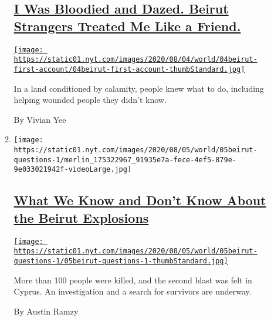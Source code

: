 \begin{enumerate}
\begin{enumerate}
    \hypertarget{i-was-bloodied-and-dazed-beirut-strangers-treated-me-like-a-friend}{%
    \subsection{\texorpdfstring{\href{/2020/08/04/world/middleeast/lebanon-explosion-beirut.html}{I
    Was Bloodied and Dazed. Beirut Strangers Treated Me Like a
    Friend.}}{I Was Bloodied and Dazed. Beirut Strangers Treated Me Like a Friend.}}\label{i-was-bloodied-and-dazed-beirut-strangers-treated-me-like-a-friend}}

    \href{/2020/08/04/world/middleeast/lebanon-explosion-beirut.html}{\texttt{[image: https://static01.nyt.com/images/2020/08/04/world/04beirut-first-account/04beirut-first-account-thumbStandard.jpg]}}

    In a land conditioned by calamity, people knew what to do, including
    helping wounded people they didn't know.

    By Vivian Yee
  \item
    \texttt{[image: https://static01.nyt.com/images/2020/08/05/world/05beirut-questions-1/merlin\_175322967\_91935e7a-fece-4ef5-879e-9e033021942f-videoLarge.jpg]}

    \hypertarget{what-we-know-and-dont-know-about-the-beirut-explosions}{%
    \subsection{\texorpdfstring{\href{/2020/08/05/world/middleeast/beirut-explosion-what-happened.html}{What
    We Know and Don't Know About the Beirut
    Explosions}}{What We Know and Don't Know About the Beirut Explosions}}\label{what-we-know-and-dont-know-about-the-beirut-explosions}}

    \href{/2020/08/05/world/middleeast/beirut-explosion-what-happened.html}{\texttt{[image: https://static01.nyt.com/images/2020/08/05/world/05beirut-questions-1/05beirut-questions-1-thumbStandard.jpg]}}

    More than 100 people were killed, and the second blast was felt in
    Cyprus. An investigation and a search for survivors are underway.

    By Austin Ramzy
  \end{enumerate}
\end{enumerate}

